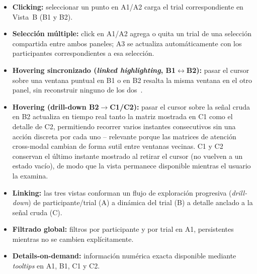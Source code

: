 \begin{itemize}
    \item \textbf{Clicking:} seleccionar un punto en A1/A2 carga el trial correspondiente en Vista~B (B1 y B2).
    \item \textbf{Selección múltiple:} click en A1/A2 agrega o quita un trial de una selección compartida entre ambos paneles; A3 se actualiza automáticamente con los participantes correspondientes a esa selección.
    \item \textbf{Hovering sincronizado (\textit{linked highlighting}, B1$\leftrightarrow$B2):} pasar el cursor sobre una ventana puntual en B1 o en B2 resalta la misma ventana en el otro panel, sin reconstruir ninguno de los dos~\cite{becker1987brushing}.
    \item \textbf{Hovering (drill-down B2$\to$C1/C2):} pasar el cursor sobre la señal cruda en B2 actualiza en tiempo real tanto la matriz mostrada en C1 como el detalle de C2, permitiendo recorrer varios instantes consecutivos sin una acción discreta por cada uno -- relevante porque las matrices de atención cross-modal cambian de forma sutil entre ventanas vecinas. C1 y C2 conservan el último instante mostrado al retirar el cursor (no vuelven a un estado vacío), de modo que la vista permanece disponible mientras el usuario la examina.
    \item \textbf{Linking:} las tres vistas conforman un flujo de exploración progresiva (\textit{drill-down}) de participante/trial (A) a dinámica del trial (B) a detalle anclado a la señal cruda (C).
    \item \textbf{Filtrado global:} filtros por participante y por trial en A1, persistentes mientras no se cambien explícitamente.
    \item \textbf{Details-on-demand:} información numérica exacta disponible mediante \textit{tooltips} en A1, B1, C1 y C2.
\end{itemize}